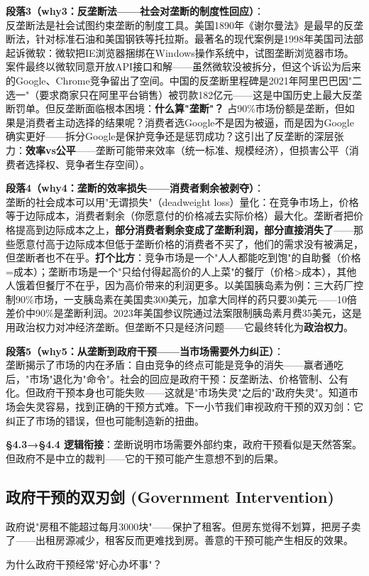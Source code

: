 \documentclass[../main.tex]{subfiles}
\begin{document}
	\textbf{段落3（why3：反垄断法——社会对垄断的制度性回应）}：\\
	反垄断法是社会试图约束垄断的制度工具。美国1890年《谢尔曼法》是最早的反垄断法，针对标准石油和美国钢铁等托拉斯。最著名的现代案例是1998年美国司法部起诉微软：微软把IE浏览器捆绑在Windows操作系统中，试图垄断浏览器市场。案件最终以微软同意开放API接口和解——虽然微软没被拆分，但这个诉讼为后来的Google、Chrome竞争留出了空间。中国的反垄断里程碑是2021年阿里巴巴因"二选一"（要求商家只在阿里平台销售）被罚款182亿元——这是中国历史上最大反垄断罚单。但反垄断面临根本困境：\textbf{什么算"垄断"？} 占90\%市场份额是垄断，但如果是消费者主动选择的结果呢？消费者选Google不是因为被逼，而是因为Google确实更好——拆分Google是保护竞争还是惩罚成功？这引出了反垄断的深层张力：\textbf{效率vs公平}——垄断可能带来效率（统一标准、规模经济），但损害公平（消费者选择权、竞争者生存空间）。

	\textbf{段落4（why4：垄断的效率损失——消费者剩余被剥夺）}：\\
	垄断的社会成本可以用"无谓损失"（deadweight loss）量化：在竞争市场上，价格等于边际成本，消费者剩余（你愿意付的价格减去实际价格）最大化。垄断者把价格提高到边际成本之上，\textbf{部分消费者剩余变成了垄断利润，部分直接消失了}——那些愿意付高于边际成本但低于垄断价格的消费者不买了，他们的需求没有被满足，但垄断者也不在乎。\textbf{打个比方}：竞争市场是一个"人人都能吃到饱"的自助餐（价格=成本）；垄断市场是一个"只给付得起高价的人上菜"的餐厅（价格>成本），其他人饿着但餐厅不在乎，因为高价带来的利润更多。以美国胰岛素为例：三大药厂控制90\%市场，一支胰岛素在美国卖300美元，加拿大同样的药只要30美元——10倍差价中90\%是垄断利润。2023年美国参议院通过法案限制胰岛素月费35美元，这是用政治权力对冲经济垄断。但垄断不只是经济问题——它最终转化为\textbf{政治权力}。

	\textbf{段落5（why5：从垄断到政府干预——当市场需要外力纠正）}：\\
	垄断揭示了市场的内在矛盾：自由竞争的终点可能是竞争的消失——赢者通吃后，"市场"退化为"命令"。社会的回应是政府干预：反垄断法、价格管制、公有化。但政府干预本身也可能失败——这就是"市场失灵"之后的"政府失灵"。知道市场会失灵容易，找到正确的干预方式难。下一小节我们审视政府干预的双刃剑：它纠正了市场的错误，但也可能制造新的扭曲。

	\textbf{§4.3→§4.4 逻辑衔接}：垄断说明市场需要外部约束，政府干预看似是天然答案。但政府不是中立的裁判——它的干预可能产生意想不到的后果。

	\subsection{政府干预的双刃剑 (Government Intervention)}
	\begin{motivation}
		政府说"房租不能超过每月3000块"——保护了租客。但房东觉得不划算，把房子卖了——出租房源减少，租客反而更难找到房。善意的干预可能产生相反的效果。
	\end{motivation}
	\begin{questionbox}
		为什么政府干预经常"好心办坏事"？
	\end{questionbox}
\end{document}

